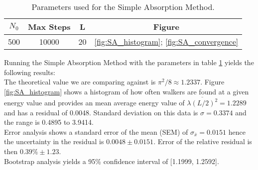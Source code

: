 \documentclass[reqno]{amsart}
\numberwithin{equation}{section}
\numberwithin{figure}{section}
\begin{document}
\begin{table}[h]
    \centering
    \begin{tabular}{cccc}
        \hline
        $N_0$ & Max Steps & L & Figure \\
        \hline
        500 & 10000 & 20 & \ref{fig:SA_histogram}; \ref{fig:SA_convergence} \\
        \hline
    \end{tabular}
    \caption{Parameters used for the Simple Absorption Method.}
    \label{tab:SA_params}
\end{table}

Running the Simple Absorption Method with the parameters in table \ref{tab:SA_params} yields the following results: \\

The theoretical value we are comparing against is $\pi^2/8 \approx 1.2337$. Figure \ref{fig:SA_histogram} shows a histogram of how often walkers are found at a given energy value and provides an mean average energy value of $\overline{\lambda (L/2)^2} = 1.2289$ and has a residual of 0.0048. Standard deviation on this data is $\sigma = 0.3374$ and the range is 0.4895 to 3.9414. \\

Error analysis shows a standard error of the mean (SEM) of $\sigma_{\bar{x}} = 0.0151$ hence the uncertainty in the residual is $0.0048 \pm 0.0151$. Error of the relative residual is then $0.39\% \pm 1.23$. \\

Bootstrap analysis yields a 95\% confidence interval of [1.1999, 1.2592].


\end{document}
